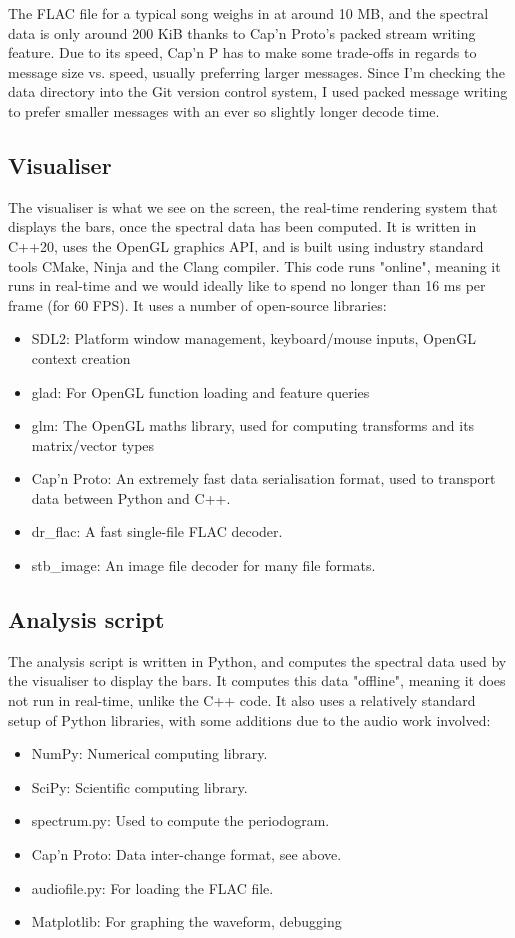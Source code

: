\documentclass[11pt]{article}
\begin{document}
The FLAC file for a typical song weighs in at around 10 MB, and the spectral data is only around 200 KiB
thanks to Cap'n Proto's packed stream writing feature. Due to its speed, Cap'n P has to make some
trade-offs in regards to message size vs. speed, usually preferring larger messages. Since I'm checking the
data directory into the Git version control system, I used packed message writing to prefer smaller messages
with an ever so slightly longer decode time.

\subsection{Visualiser}
The visualiser is what we see on the screen, the real-time rendering system that displays the bars, once the
spectral data has been computed. It is written in C++20, uses the OpenGL graphics API, and is built using
industry standard tools CMake, Ninja and the Clang compiler. This code runs "online", meaning it runs in
real-time and we would ideally like to spend no longer than 16 ms per frame (for 60 FPS). It uses a number of
open-source libraries:
\begin{itemize}
	\item SDL2: Platform window management, keyboard/mouse inputs, OpenGL context creation
	\item glad: For OpenGL function loading and feature queries
    \item glm: The OpenGL maths library, used for computing transforms and its matrix/vector types
    \item Cap'n Proto: An extremely fast data serialisation format, used to transport data between Python and
        C++.
    \item dr\_flac: A fast single-file FLAC decoder.
    \item stb\_image: An image file decoder for many file formats.
\end{itemize}

\subsection{Analysis script}
The analysis script is written in Python, and computes the spectral data used by the visualiser to display the
bars. It computes this data "offline", meaning it does not run in real-time, unlike the C++ code. It also uses
a relatively standard setup of Python libraries, with some additions due to the audio work involved:
\begin{itemize}
    \item NumPy: Numerical computing library.
    \item SciPy: Scientific computing library.
    \item spectrum.py: Used to compute the periodogram.
    \item Cap'n Proto: Data inter-change format, see above.
    \item audiofile.py: For loading the FLAC file.
    \item Matplotlib: For graphing the waveform, debugging
\end{itemize}
\end{document}
